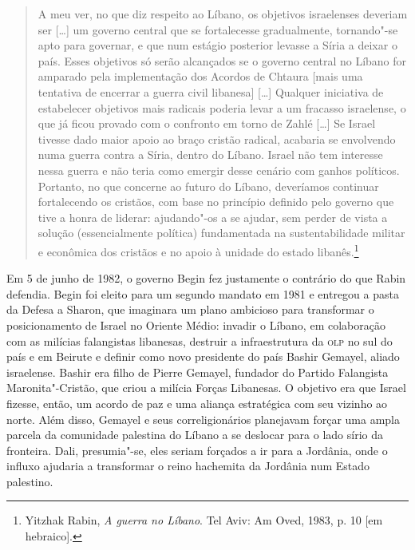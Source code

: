 \begin{quote}
A meu ver, no que diz respeito ao Líbano, os objetivos israelenses
deveriam ser {[}\ldots{}{]} um governo central que se fortalecesse gradualmente,
tornando"-se apto para governar, e que num estágio posterior levasse a Síria
a deixar o país. Esses objetivos só serão alcançados se o governo
central no Líbano for amparado pela implementação dos Acordos de Chtaura
{[}mais uma tentativa de encerrar a guerra civil libanesa{]} {[}\ldots{}{]}
Qualquer iniciativa de estabelecer objetivos mais radicais poderia levar
a um fracasso israelense, o que já ficou provado com o confronto em
torno de Zahlé {[}\ldots{}{]} Se Israel tivesse dado maior apoio ao braço cristão
radical, acabaria se envolvendo numa guerra contra a Síria, dentro do
Líbano. Israel não tem interesse nessa guerra e não teria como emergir
desse cenário com ganhos políticos. Portanto, no que concerne ao futuro
do Líbano, deveríamos continuar fortalecendo os cristãos, com base no
princípio definido pelo governo que tive a honra de liderar: ajudando"-os
a se ajudar, sem perder de vista a solução (essencialmente política)
fundamentada na sustentabilidade militar e econômica dos cristãos e no
apoio à unidade do estado libanês.\footnote{Yitzhak Rabin, \textit{A guerra no
Líbano}. Tel Aviv: Am Oved, 1983, p. 10 {[}em hebraico{]}.}
\end{quote}

Em 5 de junho de 1982, o governo Begin fez justamente o contrário do
que Rabin defendia. Begin foi eleito para um segundo
mandato em 1981 e entregou a pasta da Defesa a Sharon, que imaginara
um plano ambicioso para transformar o posicionamento de Israel
no Oriente Médio: invadir o Líbano, em colaboração com as milícias
falangistas libanesas, destruir a infraestrutura da \textsc{olp} no sul do país e
em Beirute e definir como novo presidente do país Bashir Gemayel, aliado
israelense. Bashir era filho de Pierre Gemayel, fundador do Partido
Falangista Maronita"-Cristão, que criou a milícia Forças Libanesas. O
objetivo era que Israel fizesse, então, um acordo de paz e uma aliança
estratégica com seu vizinho ao norte. Além disso, Gemayel e seus
correligionários planejavam forçar uma ampla parcela da comunidade
palestina do Líbano a se deslocar para o lado sírio da fronteira. Dali,
presumia"-se, eles seriam forçados a ir para a Jordânia, onde o influxo
ajudaria a transformar o reino hachemita da Jordânia num Estado
palestino.

